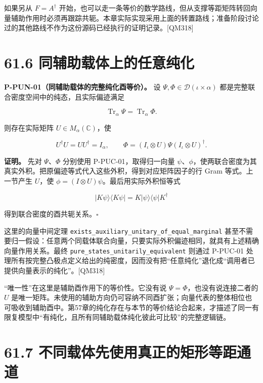 \documentclass[
  11pt,
  oneside]{book}
\begin{document}
如果另从 \(F=A^\dagger\)
开始，也可以走一条等价的数学路线，但从支撑等距矩阵转回向量辅助作用时必须再跟踪共轭。本章实际实现采用上面的转置路线；准备阶段讨论过的其他路线不作为这份源码已经执行的证明记录。{[}QM318{]}

\section{61.6 同辅助载体上的任意纯化}

\protect\hypertarget{p-pun-01}{}{}

\textbf{P-PUN-01（同辅助载体的完整纯化酉等价）。} 设
\(\Psi,\Phi\in\mathcal D(\iota\times\alpha)\)
都是完整联合密度空间中的纯态，且实际偏迹满足

\[
\operatorname{Tr}_\alpha\Psi=\operatorname{Tr}_\alpha\Phi.
\]

则存在实际矩阵 \(U\in M_\alpha(\mathbb C)\)，使

\[
U^\dagger U=UU^\dagger=I_\alpha,
\qquad
\Phi=(I_\iota\otimes U)\Psi(I_\iota\otimes U)^\dagger.
\]

\textbf{证明。} 先对 \(\Psi\)、\(\Phi\) 分别使用 P-PUC-01，取得归一向量
\(\psi\)、\(\phi\)，使两联合密度为其真实外积。把原偏迹等式代入这些外积，得到对应矩阵因子的行
Gram 等式。上一节产生 \(U\)，使
\(\phi=(I\otimes U)\psi\)。最后用实际外积恒等式

\[
|K\psi\rangle\langle K\psi|
=K|\psi\rangle\langle\psi|K^\dagger
\]

得到联合密度的酉共轭关系。\(\square\)

这里的向量中间定理
\texttt{exists\_\allowbreak auxiliary\_\allowbreak unitary\_\allowbreak of\_\allowbreak equal\_\allowbreak marginal}
甚至不需要归一假设：任意两个同载体联合向量，只要实际外积偏迹相同，就具有上述精确向量作用关系。最终
\texttt{pure\_\allowbreak states\_\allowbreak unitarily\_\allowbreak equivalent} 则通过 P-PUC-01
处理所有按完整凸极点定义给出的纯密度，因而没有把``任意纯化''退化成``调用者已提供向量表示的纯化''。{[}QM318{]}

``唯一性''在这里是辅助酉作用下的等价性。它没有说
\(\Psi=\Phi\)，也没有说连接二者的 \(U\)
是唯一矩阵。未使用的辅助方向仍可容纳不同酉扩张；向量代表的整体相位也可吸收到辅助酉中。第57章的纯化存在与本节的等价结论合起来，才描述了同一有限复模型中``有纯化，且所有同辅助载体纯化彼此可比较''的完整逻辑链。

\section{61.7 不同载体先使用真正的矩形等距通道}
\end{document}
